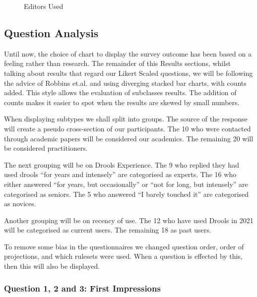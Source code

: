 \begin{figure}[h]
    \centering
    \caption{Editors Used}
    \label{fig:editorUsage}
\end{figure}


\subsection{Question Analysis}
Until now, the choice of chart to display the survey outcome has been based on a feeling rather than research. 
The remainder of this Results sections, whilst talking about results that regard our Likert Scaled questions, we will be following the advice of Robbins et.al.\cite{robbins2011plotting} and using diverging stacked bar charts, with counts added.
This style allows the evaluation of subclasses results.
The addition of counts makes it easier to spot when the results are skewed by small numbers.

When displaying subtypes we shall split into groups.
The source of the response will create a pseudo cross-section of our participants.
The 10 who were contacted through academic papers will be considered our academics.
The remaining 20 will be considered practitioners.

The next grouping will be on Drools Experience.
The 9 who replied they had used drools ``for years and intensely'' are categorised as experts.
The 16 who either answered ``for years, but occasionally'' or ``not for long, but intensely'' are categorised as seniors.
The 5 who answered ``I barely touched it'' are categorised as novices.

Another grouping will be on recency of use.
The 12 who have used Drools in 2021 will be categorised as current users.
The remaining 18 as past users.

To remove some bias in the questionnaires we changed question order, order of projections, and which rulesets were used.
When a question is effected by this, then this will also be displayed.

\subsubsection{Question 1, 2 and 3: First Impressions}

